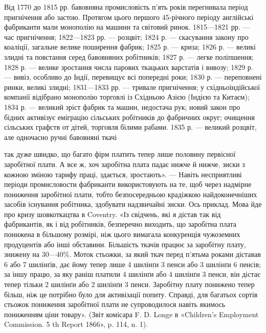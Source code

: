 Від 1770 до 1815 рр. бавовняна промисловість п’ять років перегнивала
період пригнічення або застою. Протягом цього першого
45-річного періоду англійські фабриканти мали монополію на
машини та світовий ринок. 1815—1821 рр. — час пригнічення;
1822—1823 рр. — розцвіт; 1824 р. — скасування закону про коаліції,
загальне велике поширення фабрик; 1825 р. — криза;
1826 р. — великі злидні та повстання серед бавовняних робітників;
1827 р. — легке поліпшення; 1828 р. — велике зростання
числа парових ткацьких варстатів і вивозу; 1829 р. — вивіз,
особливо до Індії, перевищує всі попередні роки; 1830 р. —
переповнені ринки, великі злидні; 1831—1833 рр. — тривале
пригнічення; у східньоіндійської компанії відібрано монополію
торговлі із Східньою Азією (Індією та Китаєм); 1834 р. — великий
зріст фабрик та машин, недостача рук; новий закон про бідних
активізує еміграцію сільських робітників до фабричних округ;
очищення сільських графств от дітей, торговля білими рабами.
1835 р. — великий розцвіт, але одночасно ручні бавовняні ткачі

так дуже швидко, що багато фірм платить тепер лише половину первісної
заробітної плати. А все ж, хоч заробітна плата падає нижче й нижче,
зиски з кожною зміною тарифу праці, здається, зростають». — Навіть
несприятливі періоди промисловости фабриканти використовують на те,
щоб через надмірне пониження заробітної плати, тобто безпосередньою
крадіжкою найдоконечніших засобів існування робітника, здобувати
надзвичайні зиски. Ось приклад. Мова йде про кризу шовкоткацтва в
Coventry. «Із свідчень, які я дістав так від фабрикантів, як і від робітників,
безперечно виходить, що заробітна плата понижена в більшому розмірі,
ніж цього вимагала конкуренція чужоземних продуцентів або інші обставини.
Більшість ткачів працює за заробітну плату, знижену на 30—40\%.
Моток стьожки, за який ткач перед п’ятьма роками діставав 6 або 7 шилінґів,
дає йому тепер лише 4 шилінґи 3 пенси або 3 шилінґи 6 пенсів;
за іншу працю, за яку раніш платили 4 шилінґи або 4 шилінґи 3 пенси,
він дістає тепер тільки 2 шилінґи або 2 шилінґи 3 пенси. Заробітну плату
понижено тепер більш, ніж це потрібно було для активізації попиту.
Справді, для багатьох сортів стьожок пониження заробітної плати не
супроводилося навіть якимось пониженням ціни товару». (Звіт комісара
F. D. Longe в «Children’s Employment Commission. 5 th Report 1866»,
p. 114, n. 1).
\parbreak{}  %
